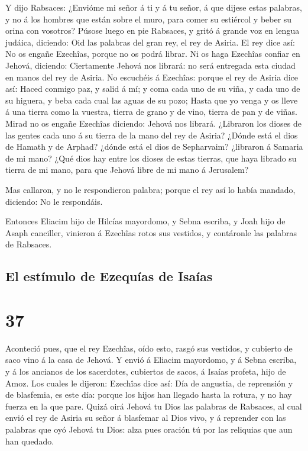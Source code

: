  Y dijo Rabsaces: ¿Envióme mi señor á ti y á tu señor, á
que dijese estas palabras, y no á los hombres que están sobre el muro,
para comer su estiércol y beber su orina con vosotros? 
Púsose luego en pie Rabsaces, y gritó á grande voz en lengua judáica,
diciendo: Oid las palabras del gran rey, el rey de Asiria.
 El rey dice así: No os engañe Ezechîas, porque no os
podrá librar.  Ni os haga Ezechîas confiar en Jehová,
diciendo: Ciertamente Jehová nos librará: no será entregada esta ciudad
en manos del rey de Asiria.  No escuchéis á Ezechîas:
porque el rey de Asiria dice así: Haced conmigo paz, y salid á mí; y
coma cada uno de su viña, y cada uno de su higuera, y beba cada cual las
aguas de su pozo;  Hasta que yo venga y os lleve á una
tierra como la vuestra, tierra de grano y de vino, tierra de pan y de
viñas.  Mirad no os engañe Ezechîas diciendo: Jehová nos
librará. ¿Libraron los dioses de las gentes cada uno á su tierra de la
mano del rey de Asiria?  ¿Dónde está el dios de Hamath y
de Arphad? ¿dónde está el dios de Sepharvaim? ¿libraron á Samaria de mi
mano?  ¿Qué dios hay entre los dioses de estas tierras,
que haya librado su tierra de mi mano, para que Jehová libre de mi mano
á Jerusalem?

 Mas callaron, y no le respondieron palabra; porque el
rey así lo había mandado, diciendo: No le respondáis.

 Entonces Eliacim hijo de Hilcías mayordomo, y Sebna
escriba, y Joah hijo de Asaph canciller, vinieron á Ezechîas rotos sus
vestidos, y contáronle las palabras de Rabsaces.

\hypertarget{el-estuxedmulo-de-ezequuxedas-de-isauxedas}{%
\subsection{El estímulo de Ezequías de
Isaías}\label{el-estuxedmulo-de-ezequuxedas-de-isauxedas}}

\hypertarget{section-23-37}{%
\section{37}\label{section-23-37}}

 Aconteció pues, que el rey Ezechîas, oído esto, rasgó sus
vestidos, y cubierto de saco vino á la casa de Jehová.  Y
envió á Eliacim mayordomo, y á Sebna escriba, y á los ancianos de los
sacerdotes, cubiertos de sacos, á Isaías profeta, hijo de Amoz.
 Los cuales le dijeron: Ezechîas dice así: Día de
angustia, de reprensión y de blasfemia, es este día: porque los hijos
han llegado hasta la rotura, y no hay fuerza en la que pare.
 Quizá oirá Jehová tu Dios las palabras de Rabsaces, al
cual envió el rey de Asiria su señor á blasfemar al Dios vivo, y á
reprender con las palabras que oyó Jehová tu Dios: alza pues oración tú
por las reliquias que aun han quedado.

